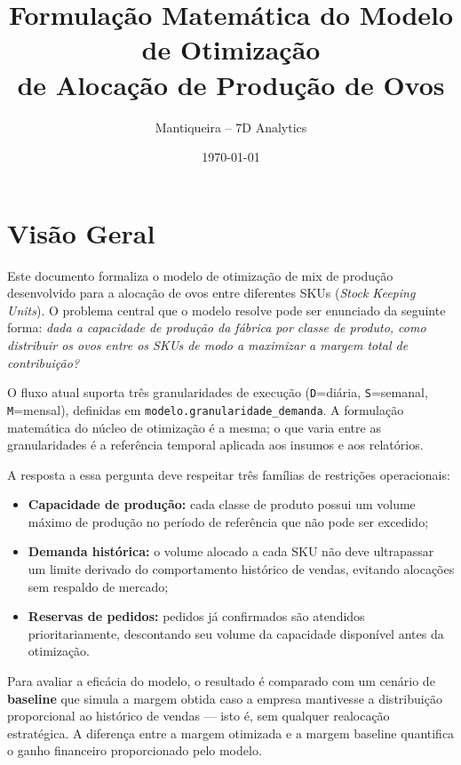\documentclass[11pt,a4paper]{article}
\title{Formulação Matemática do Modelo de Otimização\\de Alocação de Produção de Ovos}
\author{Mantiqueira -- 7D Analytics}
\date{\today}
\begin{document}
\maketitle

\tableofcontents
\newpage

\section{Visão Geral}

Este documento formaliza o modelo de otimização de mix de produção desenvolvido
para a alocação de ovos entre diferentes SKUs (\textit{Stock Keeping
Units}). O problema central que o modelo resolve pode ser enunciado da seguinte
forma: \emph{dada a capacidade de produção da fábrica por classe de produto,
como distribuir os ovos entre os SKUs de modo a maximizar a margem total de
contribuição?}

O fluxo atual suporta três granularidades de execução
(\texttt{D}=diária, \texttt{S}=semanal, \texttt{M}=mensal), definidas em
\texttt{modelo.granularidade\_demanda}. A formulação matemática do núcleo de
otimização é a mesma; o que varia entre as granularidades é a referência
temporal aplicada aos insumos e aos relatórios.

A resposta a essa pergunta deve respeitar três famílias de restrições
operacionais:
\begin{itemize}
    \item \textbf{Capacidade de produção:} cada classe de produto possui um
        volume máximo de produção no período de referência que não pode ser excedido;
    \item \textbf{Demanda histórica:} o volume alocado a cada SKU não deve
        ultrapassar um limite derivado do comportamento histórico de vendas,
        evitando alocações sem respaldo de mercado;
    \item \textbf{Reservas de pedidos:} pedidos já confirmados são atendidos
        prioritariamente, descontando seu volume da capacidade disponível antes
        da otimização.
\end{itemize}

Para avaliar a eficácia do modelo, o resultado é comparado com um cenário
de \textbf{baseline} que simula a margem obtida caso a empresa mantivesse a
distribuição proporcional ao histórico de vendas --- isto é, sem qualquer
realocação estratégica. A diferença entre a margem otimizada e a margem
baseline quantifica o ganho financeiro proporcionado pelo modelo.
\end{document}
